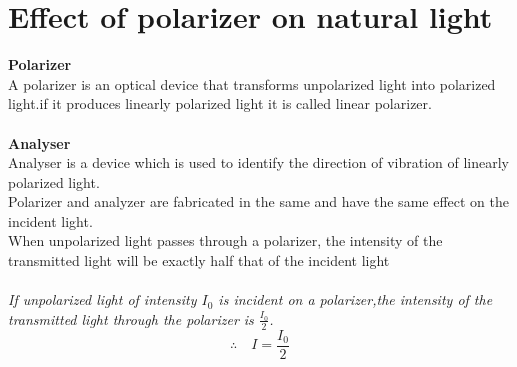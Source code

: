   \section{Effect of polarizer on natural light}
  \textbf{Polarizer}\\
  A polarizer is an optical device that transforms unpolarized light into polarized light.if it produces linearly polarized light it is called linear polarizer.\\\\
  \textbf{Analyser} \\
  Analyser is a device which is used to identify the direction of vibration of linearly polarized light.\\
  Polarizer and analyzer are fabricated in the same and have the same effect on the incident light.\\
         When unpolarized light passes through a polarizer, the intensity of the transmitted light will be exactly half that of the incident light \\\\
         \textit{If unpolarized light of intensity $I_0$ is incident on a polarizer,the intensity of the transmitted light through the polarizer is $\frac{I_0}{2}$.}
         $$\therefore \quad I=\frac{I_0}{2}$$
